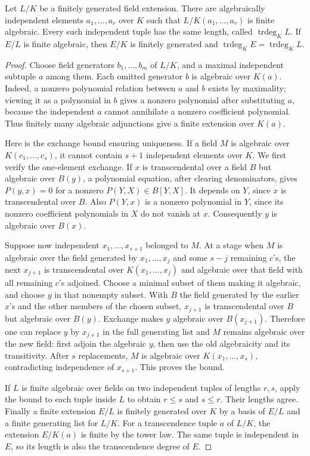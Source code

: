 \begin{theorem}
Let $L/K$ be a finitely generated field extension. There are algebraically independent elements $a_1,\ldots,a_r$ over $K$ such that $L/K(a_1,\ldots,a_r)$ is finite algebraic. Every such independent tuple has the same length, called $\operatorname{trdeg}_K L$. If $E/L$ is finite algebraic, then $E/K$ is finitely generated and $\operatorname{trdeg}_K E=\operatorname{trdeg}_K L$.
\end{theorem}
\begin{proof}
Choose field generators $b_1,\ldots,b_m$ of $L/K$, and a maximal independent subtuple $a$ among them. Each omitted generator $b$ is algebraic over $K(a)$. Indeed, a nonzero polynomial relation between $a$ and $b$ exists by maximality; viewing it as a polynomial in $b$ gives a nonzero polynomial after substituting $a$, because the independent $a$ cannot annihilate a nonzero coefficient polynomial. Thus finitely many algebraic adjunctions give a finite extension over $K(a)$.

Here is the exchange bound ensuring uniqueness. If a field $M$ is algebraic over $K(c_1,\ldots,c_s)$, it cannot contain $s+1$ independent elements over $K$. We first verify the one-element exchange. If $x$ is transcendental over a field $B$ but algebraic over $B(y)$, a polynomial equation, after clearing denominators, gives $P(y,x)=0$ for a nonzero $P(Y,X)\in B[Y,X]$. It depends on $Y$, since $x$ is transcendental over $B$. Also $P(Y,x)$ is a nonzero polynomial in $Y$, since its nonzero coefficient polynomials in $X$ do not vanish at $x$. Consequently $y$ is algebraic over $B(x)$.

Suppose now independent $x_1,\ldots,x_{s+1}$ belonged to $M$. At a stage when $M$ is algebraic over the field generated by $x_1,\ldots,x_j$ and some $s-j$ remaining $c$'s, the next $x_{j+1}$ is transcendental over $K(x_1,\ldots,x_j)$ and algebraic over that field with all remaining $c$'s adjoined. Choose a minimal subset of them making it algebraic, and choose $y$ in that nonempty subset. With $B$ the field generated by the earlier $x$'s and the other members of the chosen subset, $x_{j+1}$ is transcendental over $B$ but algebraic over $B(y)$. Exchange makes $y$ algebraic over $B(x_{j+1})$. Therefore one can replace $y$ by $x_{j+1}$ in the full generating list and $M$ remains algebraic over the new field: first adjoin the algebraic $y$, then use the old algebraicity and its transitivity. After $s$ replacements, $M$ is algebraic over $K(x_1,\ldots,x_s)$, contradicting independence of $x_{s+1}$. This proves the bound.

If $L$ is finite algebraic over fields on two independent tuples of lengths $r,s$, apply the bound to each tuple inside $L$ to obtain $r\leq s$ and $s\leq r$. Their lengths agree. Finally a finite extension $E/L$ is finitely generated over $K$ by a basis of $E/L$ and a finite generating list for $L/K$. For a transcendence tuple $a$ of $L/K$, the extension $E/K(a)$ is finite by the tower law. The same tuple is independent in $E$, so its length is also the transcendence degree of $E$.
\end{proof}
